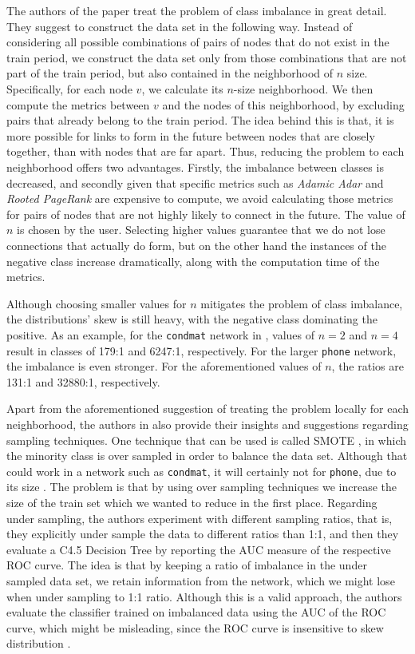 \documentclass{acm_proc_article-sp}
\begin{document}
The authors of the paper treat the problem of class imbalance in great detail. They suggest to construct the data set in the following way. Instead of considering all possible combinations of pairs of nodes that do not exist in the train period, we construct the data set only from those combinations that are not part of the train period, but also contained in the neighborhood of $n$ size. Specifically, for each node $v$, we calculate its $n$-size neighborhood. We then compute the metrics between $v$ and the nodes of this neighborhood, by excluding pairs that already belong to the train period. The idea behind this is that, it is more possible for links to form in the future between nodes that are closely together, than with nodes that are far apart. Thus, reducing the problem to each neighborhood offers two advantages. Firstly, the imbalance between classes is decreased, and secondly given that specific metrics such as \textit{Adamic Adar} and \textit{Rooted PageRank} are expensive to compute, we avoid calculating those metrics for pairs of nodes that are not highly likely to connect in the future. The value of $n$ is chosen by the user. Selecting higher values guarantee that we do not lose connections that actually do form, but on the other hand the instances of the negative class increase dramatically, along with the computation time of the metrics.

Although choosing smaller values for $n$ mitigates the problem of class imbalance, the distributions' skew is still heavy, with the negative class dominating the positive. As an example, for the \texttt{condmat} network in \cite{Lichtenwalter:2010:NPM:1835804.1835837}, values of $n=2$ and $n=4$ result in classes of 179:1 and 6247:1, respectively. For the larger \texttt{phone} network, the imbalance is even stronger. For the aforementioned values of $n$, the ratios are 131:1 and 32880:1, respectively.

Apart from the aforementioned suggestion of treating the problem locally for each neighborhood, the authors in \cite{Lichtenwalter:2010:NPM:1835804.1835837} also provide their insights and suggestions regarding sampling techniques. One technique that can be used is called SMOTE \cite{chawla2002smote}, in which the minority class is over sampled in order to balance the data set. Although that could work in a network such as \texttt{condmat}, it will certainly not for \texttt{phone}, due to its size \cite{Lichtenwalter:2010:NPM:1835804.1835837}. The problem is that by using over sampling techniques we increase the size of the train set which we wanted to reduce in the first place. Regarding under sampling, the authors experiment with different sampling ratios, that is, they explicitly under sample the data to different ratios than 1:1, and then they evaluate a C4.5 Decision Tree \cite{quinlan2014c4} by reporting the AUC measure of the respective ROC curve. The idea is that by keeping a ratio of imbalance in the under sampled data set, we retain information from the network, which we might lose when under sampling to 1:1 ratio. Although this is a valid approach, the authors evaluate the classifier trained on imbalanced data using the AUC of the ROC curve, which might be misleading, since the ROC curve is insensitive to skew distribution \cite{saito2015precision}. 
\end{document}
